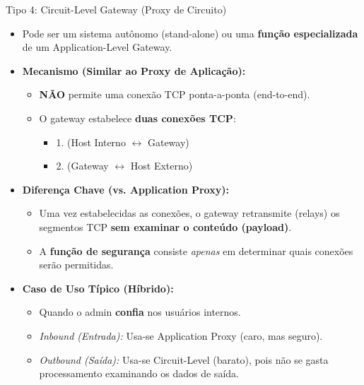 \begin{frame}{Tipo 4: Circuit-Level Gateway (Proxy de Circuito)}
    \begin{itemize}
        \item Pode ser um sistema autônomo (stand-alone) ou uma \textbf{função especializada} de um Application-Level Gateway.

        \item \textbf{Mecanismo (Similar ao Proxy de Aplicação):}
              \begin{itemize}
                  \item \textbf{NÃO} permite uma conexão TCP ponta-a-ponta (end-to-end).
                  \item O gateway estabelece \textbf{duas conexões TCP}:
                        \begin{itemize}
                            \item 1. (Host Interno $\leftrightarrow$ Gateway)
                            \item 2. (Gateway $\leftrightarrow$ Host Externo)
                        \end{itemize}
              \end{itemize}

        \item \textbf{Diferença Chave (vs. Application Proxy):}
              \begin{itemize}
                  \item Uma vez estabelecidas as conexões, o gateway retransmite (relays) os segmentos TCP \textbf{sem examinar o conteúdo (payload)}.
                  \item A \textbf{função de segurança} consiste \textit{apenas} em determinar quais conexões serão permitidas.
              \end{itemize}

        \item \textbf{Caso de Uso Típico (Híbrido):}
              \begin{itemize}
                  \item Quando o admin \textbf{confia} nos usuários internos.
                  \item \textit{Inbound (Entrada):} Usa-se Application Proxy (caro, mas seguro).
                  \item \textit{Outbound (Saída):} Usa-se Circuit-Level (barato), pois não se gasta processamento examinando os dados de saída.
              \end{itemize}
    \end{itemize}
\end{frame}

